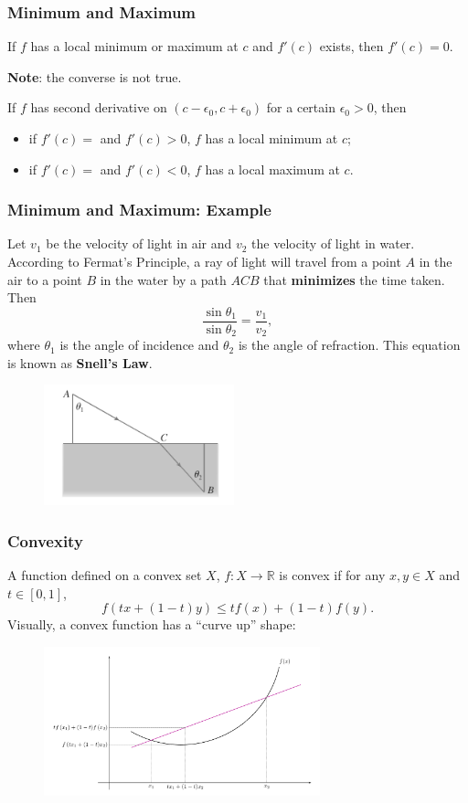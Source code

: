 \documentclass{beamer}
\begin{document}
\begin{frame}
\frametitle{Minimum and Maximum}
\begin{theorem}
If $f$ has a local minimum or maximum at $c$ and $f'(c)$ exists, then $f'(c)=0$.
\end{theorem}
\textbf{Note}: the converse is not true.
\vspace*{0.15in}
\begin{theorem}
If $f$ has second derivative on $(c-\epsilon_0,c+\epsilon_0)$ for a certain $\epsilon_0 > 0$, then
\begin{itemize}
\item if $f'(c)=$ and $f'(c) > 0$, $f$ has a local minimum at $c$;
\item if $f'(c)=$ and $f'(c) < 0$, $f$ has a local maximum at $c$.
\end{itemize}
\end{theorem}
\end{frame}

\begin{frame}
\frametitle{Minimum and Maximum: Example}
Let $v_1$ be the velocity of light in air and $v_2$ the velocity of light in water. According to Fermat's Principle, a ray of light will travel from a point $A$ in the air to a point $B$ in the water by a path $ACB$ that \textbf{minimizes} the time taken. Then
$$
\frac{\sin \theta_1}{\sin \theta_2} = \frac{v_1}{v_2},
$$
where $\theta_1$ is the angle of incidence and $\theta_2$ is the angle of refraction. This equation is known as \textbf{Snell's Law}.
\begin{figure}
\centering
\includegraphics[width=5.5cm]{Snells-Law.png}
\end{figure}

\end{frame}

\begin{frame}
\frametitle{Convexity}
A function defined on a convex set $X$, $f: X \rightarrow \mathbb{R}$ is convex if for any $x,y \in X$ and $t \in [0,1]$, 
$$
f(tx+(1-t)y) \leq tf(x) + (1-t)f(y).
$$
Visually, a convex function has a ``curve up'' shape:
\begin{figure}
\centering
\includegraphics[width=8cm]{Convex-Function.png}
\end{figure}

\end{frame}
\end{document}
